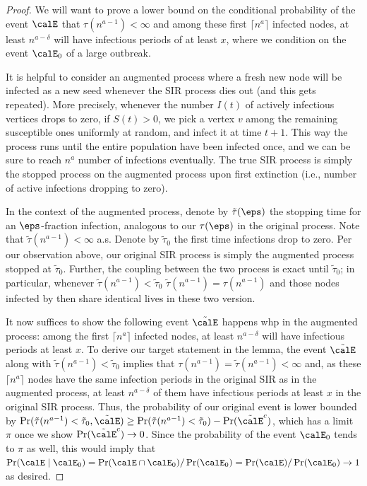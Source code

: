 \documentclass[11pt]{article}
\begin{document}
\begin{proof}
    We will want to prove a lower bound on the conditional probability of the event $\calE$ that $\tau(n^{a-1}) < \infty$ and among these first $\lceil n^a \rceil$ infected nodes, at least
    $n^{a - \delta}$ will have infectious periods of at least $x$, where we condition on the event $\calE_0$ of a large outbreak.
    
    
    It is helpful to consider an augmented process where a fresh new node will be infected as a new seed whenever the SIR process dies out (and this gets repeated). More precisely, whenever the number $I(t)$ of actively infectious vertices drops to zero, if $S(t) > 0$, we pick a vertex $v$ among the remaining susceptible ones uniformly at random, and infect it at time $t+1$. This way the process runs until the entire population have been infected once, and we can be sure to reach $n^a$ number of infections eventually. The true SIR process is simply the stopped process on the augmented process upon first extinction (i.e., number of active infections dropping to zero).

    In the context of the augmented process, denote by $\tilde \tau(\eps)$ the stopping time for an $\eps$-fraction infection, analogous to our $\tau(\eps)$ in the original process. Note that $\tilde\tau(n^{a - 1}) < \infty$ a.s. Denote by $\tilde \tau_0$ the first time infections drop to zero. Per our observation above, our original SIR process is simply the augmented process stopped at $\tilde\tau_0$. Further,  the coupling between the two process is exact until $\tilde\tau_0$; in particular, whenever $\tilde\tau(n^{a - 1}) < \tilde\tau_0$ $\tilde\tau(n^{a - 1}) = \tau(n^{a - 1})$ and those nodes infected by then share identical lives in these two version.
    
    It now suffices to show the following event $\tilde\calE$ happens whp in the augmented process: among the first $\lceil n^a \rceil$ infected nodes, at least $n^{a-\delta}$ will have infectious periods at least $x$. To derive our target statement in the lemma, the event $\tilde\calE$ along with $\tilde\tau(n^{a - 1}) < \tilde\tau_0$ implies that $\tau(n^{a-1}) = \tilde\tau(n^{a-1}) < \infty$ and, as these $\lceil n^a\rceil$ nodes have the same infection periods in the original SIR as in the augmented process, at least $n^{a-\delta}$ of them have infectious periods at least $x$ in the original SIR process. Thus, the probability of our original event is lower bounded by $\Pr(\tilde\tau(n^{a - 1}) < \tilde\tau_0, \tilde\calE) \ge \Pr(\tilde\tau(n^{a - 1}) < \tilde\tau_0) - \Pr(\tilde\calE^c)$, which has a limit $\pi$ once we show $\Pr(\tilde\calE^c) \to 0$. Since the probability of the event $\calE_0$ tends to $\pi$ as well, this would imply that $\Pr(\calE\mid\calE_0)=\Pr(\calE \cap \calE_0)/\Pr(\calE_0)=\Pr(\calE)/\Pr(\calE_0)\to 1$ as desired.


\end{proof}
\end{document}
